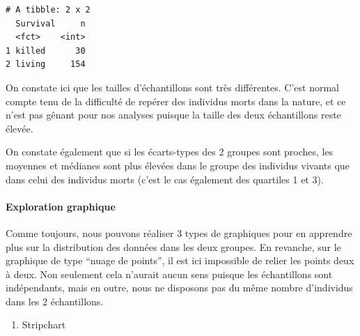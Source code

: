 \documentclass[
  a4paper,
]{article}
\newenvironment{Shaded}{\begin{snugshade}}{\end{snugshade}}
\newcommand{\DataTypeTok}[1]{\textcolor[rgb]{0.00,0.34,0.68}{#1}}
\newcommand{\DecValTok}[1]{\textcolor[rgb]{0.69,0.50,0.00}{#1}}
\newcommand{\FloatTok}[1]{\textcolor[rgb]{0.69,0.50,0.00}{#1}}
\newcommand{\KeywordTok}[1]{\textcolor[rgb]{0.12,0.11,0.11}{\textbf{#1}}}
\newcommand{\NormalTok}[1]{\textcolor[rgb]{0.12,0.11,0.11}{#1}}
\newcommand{\OperatorTok}[1]{\textcolor[rgb]{0.12,0.11,0.11}{#1}}
\newcommand{\StringTok}[1]{\textcolor[rgb]{0.75,0.01,0.01}{#1}}
\providecommand{\tightlist}{%
  \setlength{\itemsep}{0pt}\setlength{\parskip}{0pt}}
\begin{document}
\begin{Shaded}
\end{Shaded}

\begin{verbatim}
# A tibble: 2 x 2
  Survival     n
  <fct>    <int>
1 killed      30
2 living     154
\end{verbatim}

On constate ici que les tailles d'échantillons sont très différentes. C'est normal compte tenu de la difficulté de repérer des individus morts dans la nature, et ce n'est pas gênant pour nos analyses puisque la taille des deux échantillons reste élevée.

On constate également que si les écarts-types des 2 groupes sont proches, les moyennes et médianes sont plus élevées dans le groupe des individus vivants que dans celui des individus morts (c'est le cas également des quartiles 1 et 3).

\hypertarget{exploration-graphique-2}{%
\paragraph{Exploration graphique}\label{exploration-graphique-2}}

Comme toujours, nous pouvons réaliser 3 types de graphiques pour en apprendre plus sur la distribution des données dans les deux groupes. En revanche, sur le graphique de type ``nuage de points'', il est ici impossible de relier les points deux à deux. Non seulement cela n'aurait aucun sens puisque les échantillons sont indépendants, mais en outre, nous ne disposons pas du même nombre d'individus dans les 2 échantillons.

\begin{enumerate}
\def\labelenumi{\arabic{enumi}.}
\tightlist
\item
  Stripchart
\end{enumerate}

\begin{Shaded}
\end{Shaded}
\end{document}
